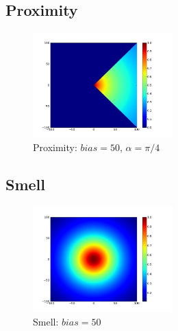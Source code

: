 \documentclass[a4paper]{article}
\begin{document}
\subsection{Proximity}
\begin{figure}
	\vspace{-30pt}
	\begin{center}
		\includegraphics[width=0.48\textwidth]{graphs/proximity.png}
	\end{center}
	\vspace{-30pt}
	\caption{Proximity: $bias=50$, $\alpha=\pi/4$}
\end{figure}

\subsection{Smell}
\begin{figure}
	\vspace{-30pt}
	\begin{center}
		\includegraphics[width=0.48\textwidth]{graphs/smell.png}
	\end{center}
	\vspace{-30pt}
	\caption{Smell: $bias=50$}
\end{figure}
\end{document}
